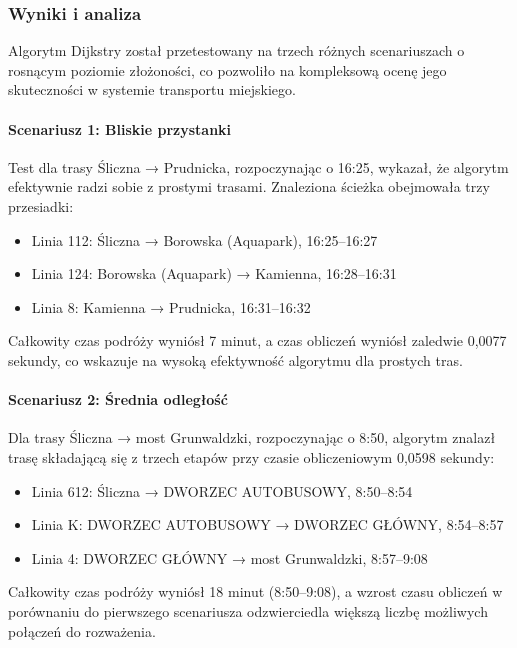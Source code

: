 \documentclass[12pt,a4paper]{article}
\begin{document}
\subsubsection{Wyniki i analiza}
Algorytm Dijkstry został przetestowany na trzech różnych scenariuszach o rosnącym poziomie złożoności, co pozwoliło na kompleksową ocenę jego skuteczności w systemie transportu miejskiego.

\paragraph{Scenariusz 1: Bliskie przystanki} 
Test dla trasy Śliczna → Prudnicka, rozpoczynając o 16:25, wykazał, że algorytm efektywnie radzi sobie z prostymi trasami. Znaleziona ścieżka obejmowała trzy przesiadki:
\begin{itemize}
    \item Linia 112: Śliczna → Borowska (Aquapark), 16:25--16:27
    \item Linia 124: Borowska (Aquapark) → Kamienna, 16:28--16:31
    \item Linia 8: Kamienna → Prudnicka, 16:31--16:32
\end{itemize}
Całkowity czas podróży wyniósł 7 minut, a czas obliczeń wyniósł zaledwie 0,0077 sekundy, co wskazuje na wysoką efektywność algorytmu dla prostych tras.

\paragraph{Scenariusz 2: Średnia odległość}
Dla trasy Śliczna → most Grunwaldzki, rozpoczynając o 8:50, algorytm znalazł trasę składającą się z trzech etapów przy czasie obliczeniowym 0,0598 sekundy:
\begin{itemize}
    \item Linia 612: Śliczna → DWORZEC AUTOBUSOWY, 8:50--8:54
    \item Linia K: DWORZEC AUTOBUSOWY → DWORZEC GŁÓWNY, 8:54--8:57
    \item Linia 4: DWORZEC GŁÓWNY → most Grunwaldzki, 8:57--9:08
\end{itemize}
Całkowity czas podróży wyniósł 18 minut (8:50--9:08), a wzrost czasu obliczeń w porównaniu do pierwszego scenariusza odzwierciedla większą liczbę możliwych połączeń do rozważenia.
\end{document}
